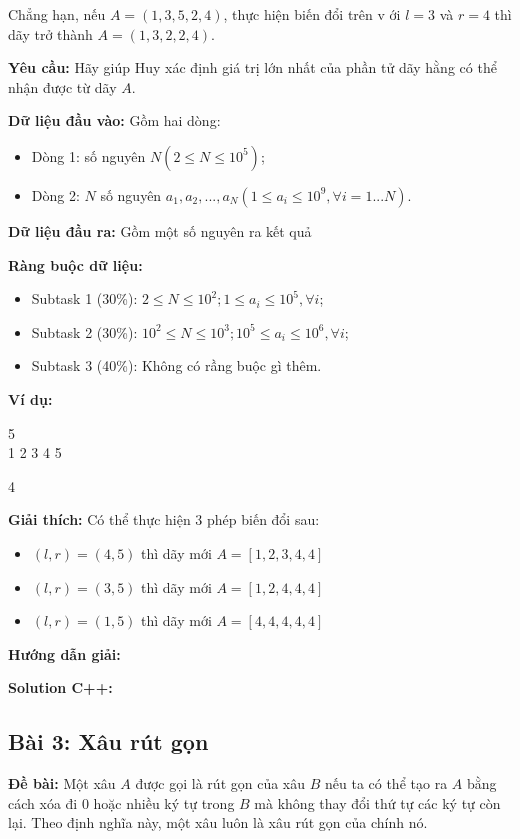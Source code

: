 \documentclass[12pt]{scrartcl}  %
\begin{document}
Chẳng hạn, nếu $A = (1, 3, 5, 2, 4)$, thực hiện biến đổi trên v ới $l = 3$ và $r = 4$ thì dãy trở thành $A = (1, 3, 2, 2, 4)$.

\textbf{Yêu cầu:}
Hãy giúp Huy xác định giá trị lớn nhất của phần tử dãy hằng có thể nhận được từ dãy $A$.

\textbf{Dữ liệu đầu vào:}
Gồm hai dòng:
\begin{itemize}
    \item Dòng 1: số nguyên $N (2 \leq N \leq 10^5)$;
    \item Dòng 2: $N$ số nguyên $a_1, a_2, ..., a_N (1 \leq a_i \leq 10^9, \forall i = 1 ... N)$.
\end{itemize}

\textbf{Dữ liệu đầu ra:}
Gồm một số nguyên ra kết quả 

\textbf{Ràng buộc dữ liệu:}
\begin{itemize}
    \item Subtask 1 (30\%): $2 \leq N \leq 10^2; 1 \leq a_i \leq 10^5, \forall i$;
    \item Subtask 2 (30\%): $10^2 \leq N \leq 10^3; 10^5 \leq a_i \leq 10^6, \forall i$;
    \item Subtask 3 (40\%): Không có rầng buộc gì thêm.
\end{itemize}

\textbf{Ví dụ:}
\begin{tcolorbox}[colback=gray!5!white, colframe=blue!50!black, title=Input]
5\\
1 2 3 4 5
\end{tcolorbox}
\begin{tcolorbox}[colback=gray!5!white, colframe=green!50!black, title=Output]
4
\end{tcolorbox}

\textbf{Giải thích:}
Có thể thực hiện $3$ phép biến đổi sau:
\begin{itemize}
    \item $(l, r) = (4, 5)$ thì dãy mới $A = \left[1, 2, 3, 4, 4 \right]$
    \item $(l, r) = (3, 5)$ thì dãy mới $A = \left[1, 2, 4, 4, 4 \right]$
    \item $(l, r) = (1, 5)$ thì dãy mới $A = \left[4, 4, 4, 4, 4 \right]$
\end{itemize}

\textbf{Hướng dẫn giải:}

\textbf{Solution C++:}

\subsection{Bài 3: Xâu rút gọn}
\textbf{Đề bài:}
Một xâu $A$ được gọi là rút gọn của xâu $B$ nếu ta có thể tạo ra $A$ bằng cách xóa đi $0$ hoặc nhiều ký tự 
trong $B$ mà không thay đổi thứ tự các ký tự còn lại. Theo định nghĩa này, một xâu luôn là xâu rút gọn của chính nó.
\end{document}
